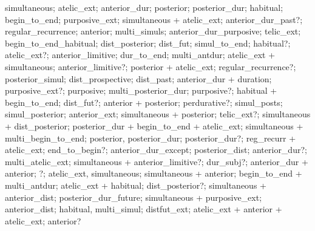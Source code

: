simultaneous; atelic\_ext; anterior\_dur; posterior; posterior\_dur; habitual; begin\_to\_end; purposive\_ext; simultaneous + atelic\_ext; anterior\_dur\_past?; regular\_recurrence; anterior; multi\_simuls; anterior\_dur\_purposive; telic\_ext; begin\_to\_end\_habitual; dist\_posterior; dist\_fut; simul\_to\_end; habitual?; atelic\_ext?; anterior\_limitive; dur\_to\_end; multi\_antdur; atelic\_ext + simultaneous; anterior\_limitive?; posterior + atelic\_ext; regular\_recurrence?; posterior\_simul; dist\_prospective; dist\_past; anterior\_dur + duration; purposive\_ext?; purposive; multi\_posterior\_dur; purposive?; habitual + begin\_to\_end; dist\_fut?; anterior + posterior; perdurative?; simul\_posts; simul\_posterior; anterior\_ext; simultaneous + posterior; telic\_ext?; simultaneous + dist\_posterior; posterior\_dur + begin\_to\_end + atelic\_ext; simultaneous + multi\_begin\_to\_end; posterior, posterior\_dur; posterior\_dur?; reg\_recurr + atelic\_ext; end\_to\_begin?; anterior\_dur\_except; posterior\_dist; anterior\_dur?; multi\_atelic\_ext; simultaneous + anterior\_limitive?; dur\_subj?; anterior\_dur + anterior; ?; atelic\_ext, simultaneous; simultaneous + anterior; begin\_to\_end + multi\_antdur; atelic\_ext + habitual; dist\_posterior?; simultaneous + anterior\_dist; posterior\_dur\_future; simultaneous + purposive\_ext; anterior\_dist; habitual, multi\_simul; distfut\_ext; atelic\_ext + anterior + atelic\_ext; anterior?%